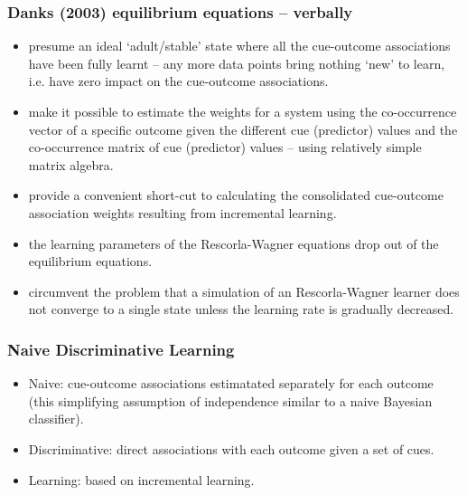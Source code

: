 \begin{frame}
  \frametitle{Danks (2003) equilibrium equations -- verbally} 

  \begin{itemize}

  \item presume an ideal `adult/stable' state where all the
    cue-outcome associations have been fully learnt -- any more data
    points bring nothing `new' to learn, i.e. have zero impact on the
    cue-outcome associations.
    
  \item make it possible to estimate the weights for a system using
    the co-occurrence vector of a specific outcome given the different
    cue (predictor) values and the co-occurrence matrix of cue
    (predictor) values -- using relatively simple matrix algebra.

  \item provide a convenient short-cut to calculating the
    consolidated cue-outcome association weights resulting from
    incremental learning.

  \item the learning parameters of the Rescorla-Wagner equations drop
    out of the equilibrium equations.

  \item circumvent the problem that a simulation of an Rescorla-Wagner
    learner does not converge to a single state unless the learning
    rate is gradually decreased.
    
\end{itemize}

\end{frame}
 
\begin{frame}
  \frametitle{Naive Discriminative Learning}

  \begin{itemize}

  \item Naive: cue-outcome associations estimatated separately for
    each outcome (this simplifying assumption of independence similar to
    a naive Bayesian classifier).

  \item Discriminative: direct associations with each outcome given a set of cues.

  \item Learning: based on incremental learning.

  \end{itemize}

\end{frame}

